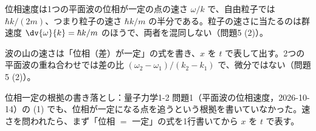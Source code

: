 \documentclass[uplatex,dvipdfmx,a4paper,11pt]{jsarticle}
\begin{document}
\matome
\begin{saitenichiran}
\end{saitenichiran}
\begin{daiji}
  \item 位相速度は1つの平面波の位相が一定の点の速さ $\omega/k$ で、自由粒子では $\hbar k/(2m)$、つまり粒子の速さ $\hbar k/m$ の半分である。粒子の速さに当たるのは群速度 $\dv{\omega}{k}=\hbar k/m$ のほうで、両者を混同しない（問題5 (2)）。
  \item 波の山の速さは「位相（差）が一定」の式を書き、$x$ を $t$ で表して出す。2つの平面波の重ね合わせでは差の比 $(\omega_{2}-\omega_{1})/(k_{2}-k_{1})$ で、微分ではない（問題5 (2)）。
\end{daiji}
\begin{maemo}
  \item 位相一定の根拠の書き落とし：量子力学1-2 問題1（平面波の位相速度，2026-10-14）の (1) でも、位相が一定になる点を追うという根拠を書いていなかった。速さを問われたら、まず「位相 $=$ 一定」の式を1行書いてから $x$ を $t$ で表す。
\end{maemo}
\end{document}
